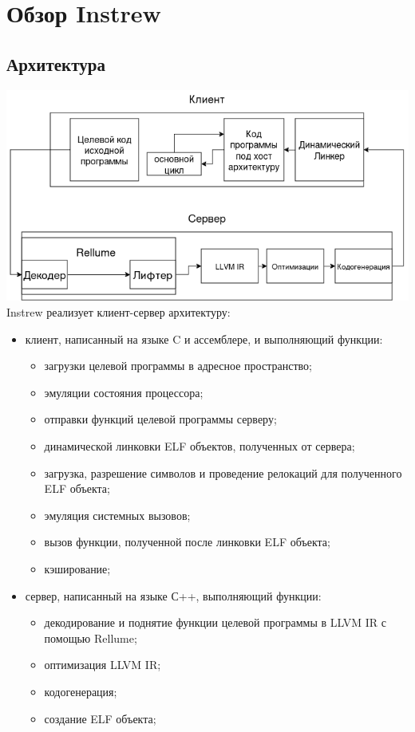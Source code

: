
\section{Обзор Instrew}
\subsection{Архитектура}
\includegraphics[width=400pt]{figures/instrew.drawio.png}
Instrew реализует клиент-сервер архитектуру:
\begin{itemize}
    \item клиент, написанный на языке C и ассемблере, и выполняющий функции:
          \begin{itemize}
              \item загрузки целевой программы в адресное пространство;
              \item эмуляции состояния процессора;
              \item отправки функций целевой программы серверу;
              \item динамической линковки ELF объектов, полученных от сервера;
              \item загрузка, разрешение символов и проведение релокаций для полученного ELF объекта;
              \item эмуляция системных вызовов;
              \item вызов функции, полученной после линковки ELF объекта;
              \item кэширование;
          \end{itemize}
    \item сервер, написанный на языке С++, выполняющий функции:
          \begin{itemize}
              \item декодирование и поднятие функции целевой программы в LLVM IR с помощью Rellume;
              \item оптимизация LLVM IR;
              \item кодогенерация;
              \item создание ELF объекта;
          \end{itemize}
\end{itemize}

